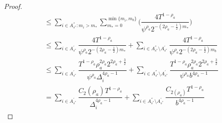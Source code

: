 \begin{proof}
\begin{align*}
&\leq\sum_{i\in A^{''}_{s^{*}}:m_{i}>m_{*}}\sum_{m_{*}=0}^{\min{\lbrace m_{i},m_{b}\rbrace}}\bigg(\dfrac{4T^{1-\rho_{a}}}{\psi^{\rho_{a}}2^{-(2\rho_{a}-\frac{1}{2})m_{*}}} \bigg)\\
&\leq\sum_{i\in A^{'}_{s^{*}}}\dfrac{4T^{1-\rho_{a}}}{\psi^{\rho_{a}}2^{-(2\rho_{a}-\frac{1}{2})m_{*}}} +\sum_{i\in A^{''}_{s^{*}}\setminus A^{'}_{s^{*}}}\dfrac{4T^{1-\rho_{a}}}{\psi^{\rho_{a}}2^{-(2\rho_{a}-\frac{1}{2})m_{b}}} \\
&\leq\sum_{i\in A^{'}_{s^{*}}}\dfrac{T^{1-\rho_{a}}\rho_{a}^{2\rho_{a}}2^{2\rho_{a}+\frac{3}{2}}}{\psi^{\rho_{a}}\Delta_{i}^{4\rho_{a}-1}} +\sum_{i\in A^{''}_{s^{*}}\setminus A^{'}_{s^{*}}}\dfrac{T^{1-\rho_{a}}\rho_{a}^{2\rho_{a}}2^{2\rho_{a}+\frac{3}{2}}}{\psi^{\rho_{a}}b^{4\rho_{a}-1}} \\
& = \sum_{i\in A^{'}_{s^{*}}}\dfrac{ C_{2}(\rho_{a}) T^{1-\rho_{a}}}{\Delta_{i}^{4\rho_{a}-1}} +\sum_{i\in A^{''}_{s^{*}}\setminus A^{'}_{s^{*}}}\dfrac{C_{2(\rho_{a})}T^{1-\rho_{a}}}{b^{4\rho_{a}-1}}
\end{align*}



\end{proof}
